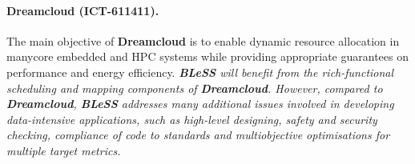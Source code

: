 \documentclass[a4paper,11pt]{article}
\newcommand{\project}[1]{\textbf{#1}\xspace}
\newcommand{\BLESS}{\project{BLeSS}}
\newcommand{\TheProject}{\BLESS}
\begin{document}


\vspace{-2pt} \paragraph{\project{Dreamcloud} (ICT-611411).}

The main objective of \project{Dreamcloud} is to enable dynamic resource allocation in manycore embedded and HPC systems while providing appropriate guarantees on performance and energy efficiency.
%
\emph{\TheProject{} will benefit from the rich-functional scheduling and mapping components of \project{Dreamcloud}. However, compared to \project{Dreamcloud}, \TheProject addresses many additional issues involved in developing data-intensive applications, such as high-level designing, safety and security checking, compliance of code to standards and multiobjective optimisations for multiple target metrics.}



\end{document}
